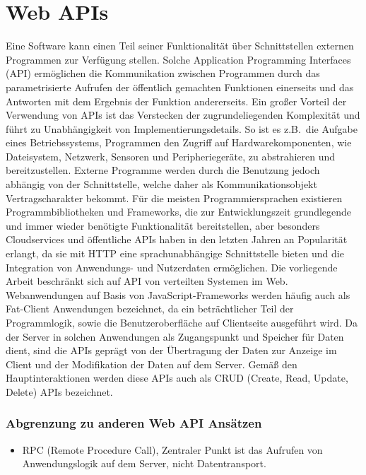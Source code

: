 \section{Web APIs}
Eine Software kann einen Teil seiner Funktionalität über Schnittstellen externen Programmen zur Verfügung stellen.
Solche Application Programming Interfaces (API) ermöglichen die Kommunikation zwischen Programmen durch das parametrisierte Aufrufen der öffentlich gemachten Funktionen einerseits und das Antworten mit dem Ergebnis der Funktion andererseits.
Ein großer Vorteil der Verwendung von APIs ist das Verstecken der zugrundeliegenden Komplexität und führt zu Unabhängigkeit von Implementierungsdetails.
So ist es z.B.\ die Aufgabe eines Betriebssystems, Programmen den Zugriff auf Hardwarekomponenten, wie Dateisystem, Netzwerk, Sensoren und Peripheriegeräte, zu abstrahieren und bereitzustellen.
Externe Programme werden durch die Benutzung jedoch abhängig von der Schnittstelle, welche daher als Kommunikationsobjekt Vertragscharakter bekommt.
Für die meisten Programmiersprachen existieren Programmbibliotheken und Frameworks, die zur Entwicklungszeit grundlegende und immer wieder benötigte Funktionalität bereitstellen, aber besonders Cloudservices und öffentliche APIs haben in den letzten Jahren an Popularität erlangt, da sie mit HTTP eine sprachunabhängige Schnittstelle bieten und die Integration von Anwendungs- und Nutzerdaten ermöglichen.
Die vorliegende Arbeit beschränkt sich auf API von verteilten Systemen im Web.
Webanwendungen auf Basis von JavaScript-Frameworks werden häufig auch als Fat-Client Anwendungen bezeichnet, da ein beträchtlicher Teil der Programmlogik, sowie die Benutzeroberfläche auf Clientseite ausgeführt wird.
Da der Server in solchen Anwendungen als Zugangspunkt und Speicher für Daten dient, sind die APIs geprägt von der Übertragung der Daten zur Anzeige im Client und der Modifikation der Daten auf dem Server.
Gemäß den Hauptinteraktionen werden diese APIs auch als CRUD (Create, Read, Update, Delete) APIs bezeichnet.
\subsubsection{Abgrenzung zu anderen Web API Ansätzen}
\begin{itemize}
  \item RPC (Remote Procedure Call), Zentraler Punkt ist das Aufrufen von Anwendungslogik auf dem Server, nicht Datentransport.
\end{itemize}
